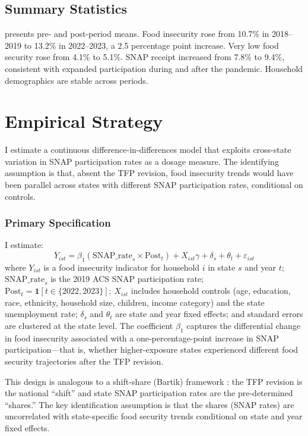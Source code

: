\documentclass[12pt]{article}
\begin{document}
\subsection{Summary Statistics}



 presents pre- and post-period means. Food insecurity rose from 10.7\% in 2018--2019 to 13.2\% in 2022--2023, a 2.5 percentage point increase. Very low food security rose from 4.1\% to 5.1\%. SNAP receipt increased from 7.8\% to 9.4\%, consistent with expanded participation during and after the pandemic. Household demographics are stable across periods.

\section{Empirical Strategy}

I estimate a continuous difference-in-differences model that exploits cross-state variation in SNAP participation rates as a dosage measure. The identifying assumption is that, absent the TFP revision, food insecurity trends would have been parallel across states with different SNAP participation rates, conditional on controls.

\subsubsection*{Primary Specification} I estimate:
\begin{equation}
Y_{ist} = \beta_1 (\text{SNAP\_rate}_s \times \text{Post}_t) + X_{ist}\gamma + \delta_s + \theta_t + \varepsilon_{ist}
\label{eq:main}
\end{equation}
where $Y_{ist}$ is a food insecurity indicator for household $i$ in state $s$ and year $t$; $\text{SNAP\_rate}_s$ is the 2019 ACS SNAP participation rate; $\text{Post}_t = \mathbf{1}[t \in \{2022, 2023\}]$; $X_{ist}$ includes household controls (age, education, race, ethnicity, household size, children, income category) and the state unemployment rate; $\delta_s$ and $\theta_t$ are state and year fixed effects; and standard errors are clustered at the state level. The coefficient $\beta_1$ captures the differential change in food insecurity associated with a one-percentage-point increase in SNAP participation---that is, whether higher-exposure states experienced different food security trajectories after the TFP revision.

This design is analogous to a shift-share (Bartik) framework \citep{bartik1991, borusyak2022}: the TFP revision is the national ``shift'' and state SNAP participation rates are the pre-determined ``shares.'' The key identification assumption is that the shares (SNAP rates) are uncorrelated with state-specific food security trends conditional on state and year fixed effects.
\end{document}
